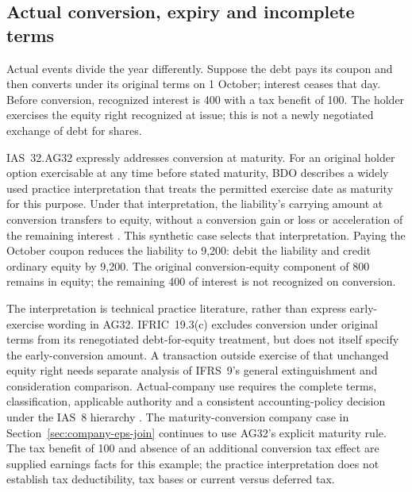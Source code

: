 

\subsection{Actual conversion, expiry and incomplete terms}

Actual events divide the year differently. Suppose the debt pays its coupon
and then converts under its original terms on 1 October; interest ceases
that day. Before conversion, recognized interest is 400 with a tax benefit
of 100. The holder exercises the equity right recognized at issue; this is
not a newly negotiated exchange of debt for shares.

IAS~32.AG32 expressly addresses conversion at maturity. For an original
holder option exercisable at any time before stated maturity, BDO describes
a widely used practice interpretation that treats the permitted exercise
date as maturity for this purpose. Under that interpretation, the liability's
carrying amount at conversion transfers to equity, without a conversion gain
or loss or acceleration of the remaining interest
\citep[section 4.5, p.~19]{bdoconvertible2026}.
This synthetic case selects that interpretation. Paying the October coupon
reduces the liability to 9,200: debit the liability and credit ordinary equity
by 9,200. The original conversion-equity component of 800 remains in equity;
the remaining 400 of interest is not recognized on conversion.

The interpretation is technical practice literature, rather than express
early-exercise wording in AG32. IFRIC~19.3(c) excludes conversion under original
terms from its renegotiated debt-for-equity treatment, but does not itself
specify the early-conversion amount. A transaction outside exercise of that
unchanged equity right needs separate analysis of IFRS~9's general
extinguishment and consideration comparison. Actual-company use requires
the complete terms, classification, applicable authority and a consistent
accounting-policy decision under the IAS~8 hierarchy
\citep[IAS~32, paragraphs 28--32 and AG32--35; IFRS~9, paragraphs 3.3.1--3.3.3;
IFRIC~19, paragraphs 2--3; IAS~8, paragraphs 9--13]{eu20231803}.
The maturity-conversion company case in Section~\ref{sec:company-eps-join}
continues to use AG32's explicit maturity rule. The tax benefit of 100 and
absence of an additional conversion tax effect are supplied earnings facts
for this example; the practice interpretation does not establish tax
deductibility, tax bases or current versus deferred tax.

